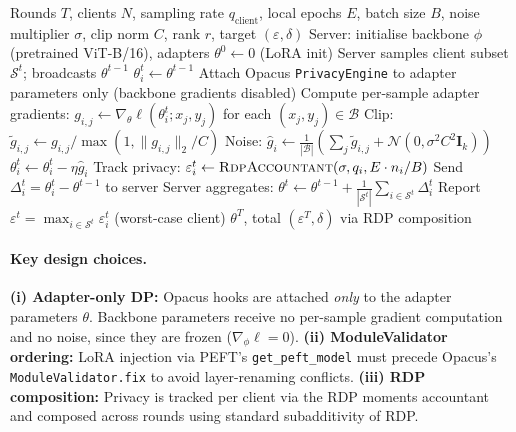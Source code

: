 ﻿\documentclass{article}
\newcommand{\method}{DP-FedLoRA}
\renewcommand{\eps}{\varepsilon}
\newcommand{\noise}{\sigma}
\newcommand{\clip}{C}
\begin{document}
\begin{algorithm}[h]
\caption{\method{}: Differentially Private Federated LoRA}
\label{alg:dpfedlora}
\begin{algorithmic}[1]
\REQUIRE Rounds $T$, clients $N$, sampling rate $q_{\text{client}}$,
         local epochs $E$, batch size $B$, noise multiplier $\noise$,
         clip norm $\clip$, rank $r$, target $(\eps, \delta)$
\STATE Server: initialise backbone $\phi$ (pretrained ViT-B/16), adapters
       $\theta^0 \gets 0$ (LoRA init)
  \STATE Server samples client subset $\mathcal{S}^t$; broadcasts $\theta^{t-1}$
    \STATE $\theta_i^t \gets \theta^{t-1}$
    \STATE Attach Opacus \texttt{PrivacyEngine} to adapter parameters
           only (backbone gradients disabled)
        \STATE Compute per-sample adapter gradients:
               $g_{i,j} \gets \nabla_{\theta} \ell(\theta_i^t; x_j, y_j)$
               for each $(x_j, y_j) \in \mathcal{B}$
        \STATE Clip: $\tilde{g}_{i,j} \gets g_{i,j} / \max(1, \|g_{i,j}\|_2 / \clip)$
        \STATE Noise: $\hat{g}_i \gets \frac{1}{|\mathcal{B}|}
               \left(\sum_j \tilde{g}_{i,j} + \mathcal{N}(0, \noise^2 \clip^2 \mathbf{I}_k)\right)$
        \STATE $\theta_i^t \gets \theta_i^t - \eta \hat{g}_i$
      \ENDFOR
    \ENDFOR
    \STATE Track privacy: $\eps_i^t \gets \textsc{RdpAccountant}(\noise, q_i, E \cdot n_i / B)$
    \STATE Send $\Delta_i^t = \theta_i^t - \theta^{t-1}$ to server
  \ENDFOR
  \STATE Server aggregates:
         $\theta^t \gets \theta^{t-1} + \frac{1}{|\mathcal{S}^t|}\sum_{i \in \mathcal{S}^t} \Delta_i^t$
  \STATE Report $\eps^t = \max_{i \in \mathcal{S}^t} \eps_i^t$ (worst-case client)
\ENDFOR
\RETURN $\theta^T$, total $(\eps^T, \delta)$ via RDP composition
\end{algorithmic}
\end{algorithm}

\paragraph{Key design choices.}
\textbf{(i) Adapter-only DP:} Opacus hooks are attached \emph{only} to the
adapter parameters $\theta$.
Backbone parameters receive no per-sample gradient computation and no noise,
since they are frozen ($\nabla_\phi \ell = 0$).
\textbf{(ii) ModuleValidator ordering:} LoRA injection via PEFT's
\texttt{get\_peft\_model} must precede Opacus's \texttt{ModuleValidator.fix}
to avoid layer-renaming conflicts.
\textbf{(iii) RDP composition:} Privacy is tracked per client via the
RDP moments accountant and composed across rounds using standard
subadditivity of RDP.
\end{document}
